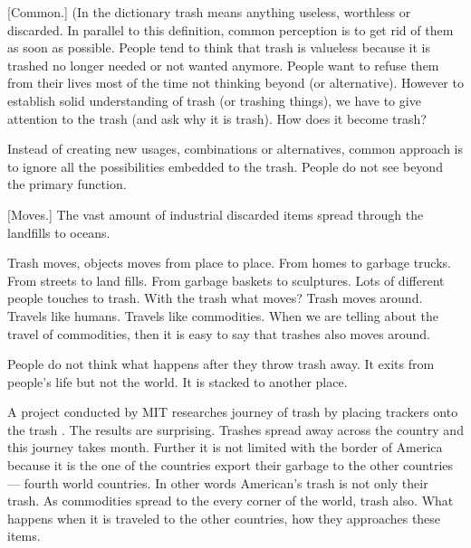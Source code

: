 




%
%
[Common.] (In the dictionary  trash means anything useless, worthless or discarded. In parallel to this definition, common perception is to get rid of them as soon as possible. People tend to think that trash is valueless because it is trashed no longer needed or not wanted anymore. People want to refuse them from their lives most of the time not thinking beyond (or alternative). However to establish solid understanding of trash (or trashing things), we have to give attention to the trash (and ask why it is trash).  How does it become trash? 

Instead of creating new usages, combinations or alternatives, common approach is to ignore all the possibilities embedded to the trash. People do not see beyond the primary function.





%
%
[Moves.] The vast amount of industrial discarded items spread through the landfills to oceans.

Trash moves, objects moves from place to place. From homes to garbage trucks. From streets to land fills. From garbage baskets to sculptures. Lots of different people touches to trash. With the trash what moves? Trash moves around. Travels like humans. Travels like commodities. When we are telling about the travel of commodities, then it is easy to say that trashes also moves around.

People do not think what happens after they throw trash away.  It exits from people's life but not the world. It is stacked to another place. 

A project conducted by MIT researches journey of trash by placing trackers onto the trash \cite{chen2009mit}. The results are surprising. Trashes spread away across the country and this journey takes month. Further it is not limited with the border of America because it is the one of the countries export their garbage to the other countries --- fourth world countries. In other words American's trash is not only their trash. As commodities spread to the every corner of the world, trash also. What happens when it is traveled to the other countries, how they approaches these items.  





